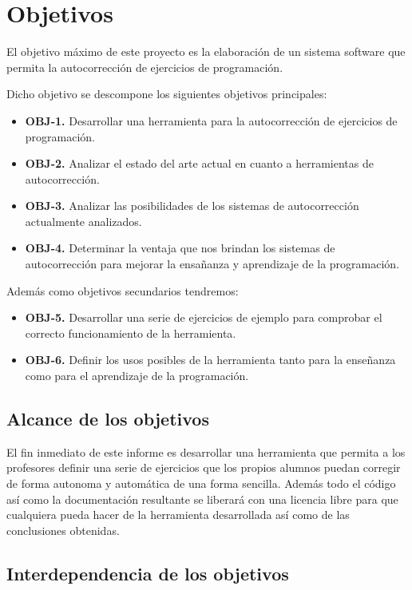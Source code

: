 \chapter{Objetivos}

El objetivo máximo de este proyecto es la elaboración de un sistema software que permita la autocorrección de ejercicios de programación.

\bigskip
Dicho objetivo se descompone los siguientes objetivos principales:

\begin{itemize}
  \item \textbf{OBJ-1.} Desarrollar una herramienta para la autocorrección de ejercicios de programación.
  \item \textbf{OBJ-2.} Analizar el estado del arte actual en cuanto a herramientas de autocorrección.
  \item \textbf{OBJ-3.} Analizar las posibilidades de los sistemas de autocorrección actualmente analizados.
  \item \textbf{OBJ-4.} Determinar la ventaja que nos brindan los sistemas de autocorrección para mejorar la ensañanza y aprendizaje de la programación.
\end{itemize}

Además como objetivos secundarios tendremos:

\begin{itemize}
  \item \textbf{OBJ-5.} Desarrollar una serie de ejercicios de ejemplo para comprobar el correcto funcionamiento de la herramienta.
  \item \textbf{OBJ-6.} Definir los usos posibles de la herramienta tanto para la enseñanza como para el aprendizaje de la programación.
\end{itemize}


\section{Alcance de los objetivos}
El fin inmediato de este informe es desarrollar una herramienta que permita a los profesores definir una serie de ejercicios que los propios alumnos puedan corregir de forma autonoma y automática de una forma sencilla.
Además todo el código así como la documentación resultante se liberará con una licencia libre para que cualquiera pueda hacer de la herramienta desarrollada así como de las conclusiones obtenidas.

\section{Interdependencia de los objetivos}


